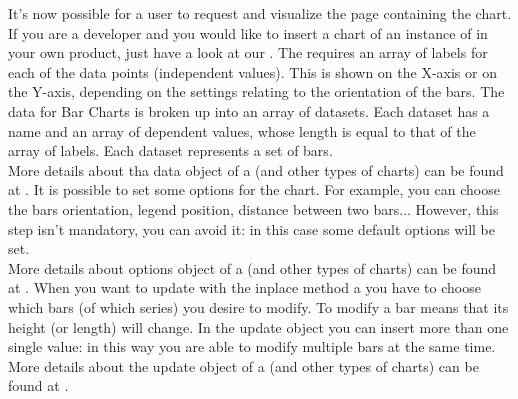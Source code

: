 		It's now possible for a user to request and visualize the page containing the chart.\\
		If you are a developer and you would like to insert a chart of an instance of  in your own product, just have a look at our .
			The  requires an array of labels for each of the data points (independent values). This is shown on the X-axis or on the Y-axis, depending on the settings relating to the orientation of the bars. The data for Bar Charts is broken up into an array of datasets. Each dataset has a name and an array of dependent values, whose length is equal to that of the array of labels. Each dataset represents a set of bars.\\
			More details about tha data object of a  (and other types of charts) can be found at .
			It is possible to set some options for the chart. For example, you can choose the bars orientation, legend position, distance between two bars... However, this step isn't mandatory, you can avoid it: in this case some default options will be set.\\
			More details about options object of a  (and other types of charts) can be found at .
			When you want to update with the inplace method a  you have to choose which bars (of which series) you desire to modify. To modify a bar means that its height (or length) will change. In the update object you can insert more than one single value: in this way you are able to modify multiple bars at the same time.\\
			More details about the update object of a  (and other types of charts) can be found at .
